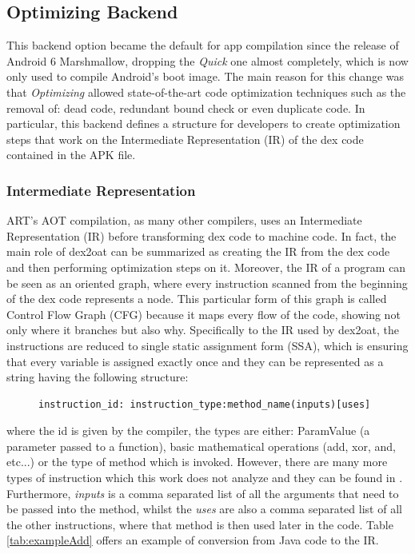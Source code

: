 \subsection{Optimizing Backend}
This backend option became the default for app compilation since the release of Android 6 Marshmallow, dropping the \emph{Quick} one almost completely, which is now only used to compile Android's boot image. The main reason for this change was that \emph{Optimizing} allowed state-of-the-art code optimization techniques such as the removal of: dead code, redundant bound check or even duplicate code. In particular, this backend defines a structure for developers to create optimization steps that work on the Intermediate Representation (IR) of the dex code contained in the APK file.

\subsubsection{Intermediate Representation}
ART's AOT compilation, as many other compilers, uses an Intermediate Representation (IR) before transforming dex code to machine code. In fact, the main role of dex2oat can be summarized as creating the IR from the dex code and then performing optimization steps on it. Moreover, the IR of a program can be seen as an oriented graph, where every instruction scanned from the beginning of the dex code represents a node. This particular form of this graph is called Control Flow Graph (CFG) because it maps every flow of the code, showing not only where it branches but also why. Specifically to the IR used by dex2oat, the instructions are reduced to single static assignment form (SSA), which is ensuring that every variable is assigned exactly once and they can be represented as a string having the following structure:
\begin{figure}[H]
\centering
\begin{BVerbatim}
instruction_id: instruction_type:method_name(inputs)[uses]
\end{BVerbatim}
\end{figure}
where the id is given by the compiler, the types are either: ParamValue (a parameter passed to a function), basic mathematical operations (add, xor, and, etc...) or the type of method which is invoked. However, there are many more types of instruction which this work does not analyze and they can be found in \cite{artist}. Furthermore, \emph{inputs} is a comma separated list of all the arguments that need to be passed into the method, whilst the \emph{uses} are also a comma separated list of all the other instructions, where that method is then used later in the code. Table \ref{tab:exampleAdd} offers an example of conversion from Java code to the IR.\newline

